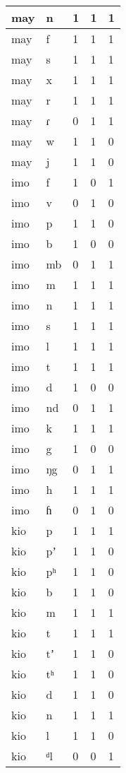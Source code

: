 \begin{longtable}{ | l | l | l | l | l | }
	may & n & 1 & 1 & 1 \\ \hline
	may & f & 1 & 1 & 1 \\ \hline
	may & s & 1 & 1 & 1 \\ \hline
	may & x & 1 & 1 & 1 \\ \hline
	may & r & 1 & 1 & 1 \\ \hline
	may & ɾ & 0 & 1 & 1 \\ \hline
	may & w & 1 & 1 & 0 \\ \hline
	may & j & 1 & 1 & 0 \\ \hline
	imo & f & 1 & 0 & 1 \\ \hline
	imo & v & 0 & 1 & 0 \\ \hline
	imo & p & 1 & 1 & 0 \\ \hline
	imo & b & 1 & 0 & 0 \\ \hline
	imo & mb & 0 & 1 & 1 \\ \hline
	imo & m & 1 & 1 & 1 \\ \hline
	imo & n & 1 & 1 & 1 \\ \hline
	imo & s & 1 & 1 & 1 \\ \hline
	imo & l & 1 & 1 & 1 \\ \hline
	imo & t & 1 & 1 & 1 \\ \hline
	imo & d & 1 & 0 & 0 \\ \hline
	imo & nd & 0 & 1 & 1 \\ \hline
	imo & k & 1 & 1 & 1 \\ \hline
	imo & g & 1 & 0 & 0 \\ \hline
	imo & ŋg & 0 & 1 & 1 \\ \hline
	imo & h & 1 & 1 & 1 \\ \hline
	imo & ɦ & 0 & 1 & 0 \\ \hline
	kio & p & 1 & 1 & 1 \\ \hline
	kio & pʼ & 1 & 1 & 0 \\ \hline
	kio & pʰ & 1 & 1 & 0 \\ \hline
	kio & b & 1 & 1 & 0 \\ \hline
	kio & m & 1 & 1 & 1 \\ \hline
	kio & t & 1 & 1 & 1 \\ \hline
	kio & tʼ & 1 & 1 & 0 \\ \hline
	kio & tʰ & 1 & 1 & 0 \\ \hline
	kio & d & 1 & 1 & 0 \\ \hline
	kio & n & 1 & 1 & 1 \\ \hline
	kio & l & 1 & 1 & 0 \\ \hline
	kio & ᵈl & 0 & 0 & 1 \\ \hline

\end{longtable}
